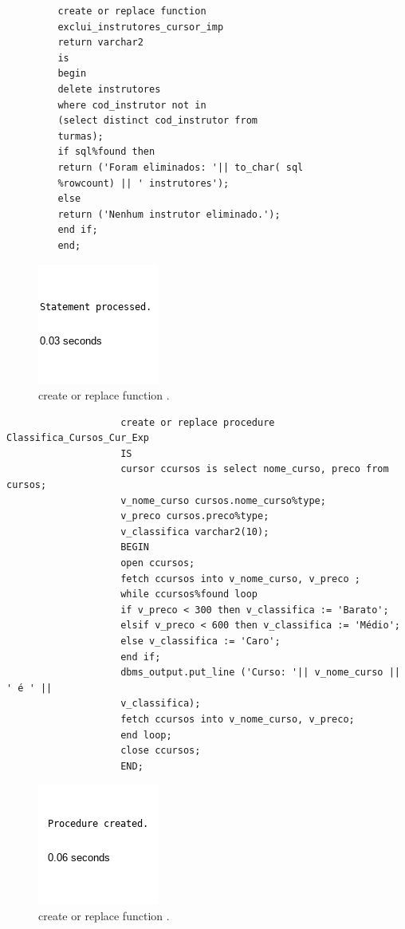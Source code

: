 \documentclass[
article,			%
11pt,				%
oneside,			%
a4paper,			%
english,			%
brazil,				%
sumario=tradicional
]{abntex2}
\begin{document}
\begin{enumerate}
		 												\begin{verbatim}
		 create or replace function
		 exclui_instrutores_cursor_imp
		 return varchar2
		 is
		 begin
		 delete instrutores
		 where cod_instrutor not in
		 (select distinct cod_instrutor from
		 turmas);
		 if sql%found then
		 return ('Foram eliminados: '|| to_char( sql
		 %rowcount) || ' instrutores');
		 else
		 return ('Nenhum instrutor eliminado.');
		 end if;
		 end;
		 \end{verbatim}
		 \begin{center}
		 	\begin{figure}[H]
		 		\centering
		 		\includegraphics[scale=0.5]{./imagens/36.png}
		 		\caption{	create or replace function .}
		 		\label{rota-1}
		 	\end{figure}
		 \end{center}
																			\begin{verbatim}
					create or replace procedure Classifica_Cursos_Cur_Exp
					IS
					cursor ccursos is select nome_curso, preco from cursos;
					v_nome_curso cursos.nome_curso%type;
					v_preco cursos.preco%type;
					v_classifica varchar2(10);
					BEGIN
					open ccursos;
					fetch ccursos into v_nome_curso, v_preco ;
					while ccursos%found loop
					if v_preco < 300 then v_classifica := 'Barato';
					elsif v_preco < 600 then v_classifica := 'Médio';
					else v_classifica := 'Caro';
					end if;
					dbms_output.put_line ('Curso: '|| v_nome_curso || ' é ' ||
					v_classifica);
					fetch ccursos into v_nome_curso, v_preco;
					end loop;
					close ccursos;
					END;
					\end{verbatim}
					\begin{center}
						\begin{figure}[H]
							\centering
							\includegraphics[scale=0.5]{./imagens/38.png}
							\caption{	create or replace function .}
							\label{rota-1}
						\end{figure}
					\end{center}
					

\end{enumerate}
\end{document}
